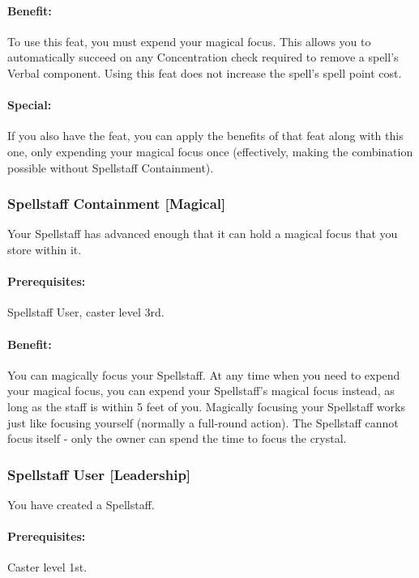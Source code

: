 \paragraph{Benefit:} To use this feat, you must expend your magical focus.
This allows you to automatically succeed on any Concentration check required to remove a spell's Verbal component.
Using this feat does not increase the spell's spell point cost.

\paragraph{Special:} If you also have the  feat, you can apply the benefits of that feat along with this one, only expending your magical focus once 
(effectively, making the combination possible without Spellstaff Containment).
\subsubsection[Spellstaff Containment]{Spellstaff Containment [Magical]}
\label{Feat:SpellstaffContainment}
Your Spellstaff has advanced enough that it can hold a magical focus that you store within it.

\paragraph{Prerequisites:} Spellstaff User, caster level 3rd.

\paragraph{Benefit:} You can magically focus your Spellstaff. 
At any time when you need to expend your magical focus, you can expend your Spellstaff's magical focus instead, as long as the staff is within 5 feet of you. 
Magically focusing your Spellstaff works just like focusing yourself (normally a full-round action).
The Spellstaff cannot focus itself - only the owner can spend the time to focus the crystal.

\subsubsection[Spellstaff User]{Spellstaff User [Leadership]}
\label{Feat:SpellstaffUser}
You have created a Spellstaff.

\paragraph{Prerequisites:} Caster level 1st.
 
